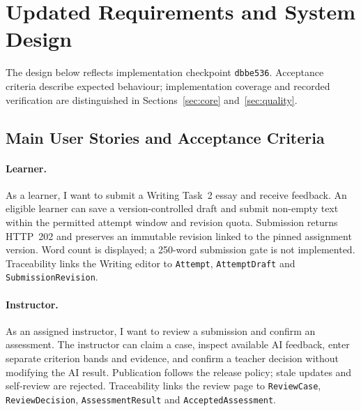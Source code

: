 
\section{Updated Requirements and System Design}
\label{sec:design}

The design below reflects implementation checkpoint \texttt{dbbe536}.
Acceptance criteria describe expected behaviour; implementation coverage
and recorded verification are distinguished in Sections~\ref{sec:core}
and~\ref{sec:quality}.

\subsection{Main User Stories and Acceptance Criteria}

\paragraph{Learner.}
As a learner, I want to submit a Writing Task~2 essay and receive feedback.
An eligible learner can save a version-controlled draft and submit
non-empty text within the permitted attempt window and revision quota.
Submission returns HTTP~202 and preserves an immutable revision linked to
the pinned assignment version. Word count is displayed; a 250-word
submission gate is not implemented. Traceability links the Writing editor
to \texttt{Attempt}, \texttt{AttemptDraft} and \texttt{SubmissionRevision}.

\paragraph{Instructor.}
As an assigned instructor, I want to review a submission and confirm an
assessment. The instructor can claim a case, inspect available AI feedback,
enter separate criterion bands and evidence, and confirm a teacher decision
without modifying the AI result. Publication follows the release policy;
stale updates and self-review are rejected. Traceability links the review
page to \texttt{ReviewCase}, \texttt{ReviewDecision},
\texttt{AssessmentResult} and \texttt{AcceptedAssessment}.

